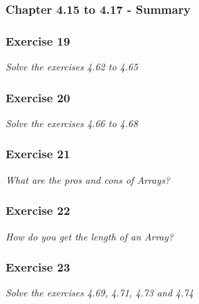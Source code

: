 \subsubsection{Chapter 4.15 to 4.17 - Summary}

\subsubsection*{Exercise 19}
\textit{Solve the exercises 4.62 to 4.65}\\

\subsubsection*{Exercise 20}
\textit{Solve the exercises 4.66 to 4.68}\\

\subsubsection*{Exercise 21}
\textit{What are the pros and cons of Arrays?}\\

\subsubsection*{Exercise 22}
\textit{How do you get the length of an Array?}\\

\subsubsection*{Exercise 23}
\textit{Solve the exercises 4.69, 4.71, 4.73 and 4.74}\\




